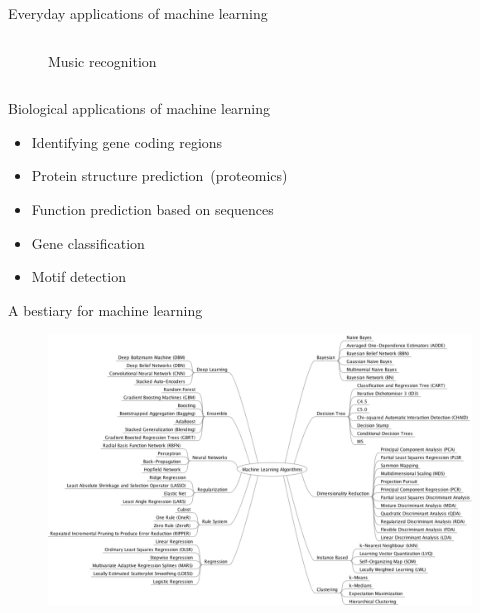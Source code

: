 \documentclass[aspectratio=169]{beamer}
\begin{document}
\begin{frame}{Everyday applications of machine learning}
\begin{columns}
{\begin{figure}
            \caption{\scriptsize Music recognition}
          \end{figure}
        }
    \end{columns}
  \end{frame}

  \begin{frame}{Biological applications of machine learning}
    \begin{itemize}
      \item Identifying gene coding regions
      \item Protein structure prediction~(proteomics)
      \item Function prediction based on sequences
      \item Gene classification
      \item Motif detection
    \end{itemize}
  \end{frame}

  \begin{frame}{A bestiary for machine learning}
    \begin{figure}
      \includegraphics[width=0.75\linewidth]{Figures/Zoo}
    \end{figure}
  \end{frame}
\end{document}
